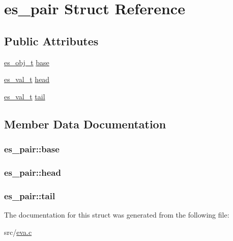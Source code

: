 \hypertarget{structes__pair}{\section{es\-\_\-pair Struct Reference}
\label{structes__pair}
}
\subsection*{Public Attributes}
\begin{DoxyCompactItemize}
\item 
\hyperlink{eva_8h_a3370a89a85f5ff467ca5e7dba47e63bc}{es\-\_\-obj\-\_\-t} \hyperlink{structes__pair_a6ca3203b44a47d4612af5f45303f96a9}{base}
\item 
\hyperlink{eva_8h_a31286b308f3660f383b567314be88045}{es\-\_\-val\-\_\-t} \hyperlink{structes__pair_a0ea11883f9bd8a3e249c6b54d03f3e95}{head}
\item 
\hyperlink{eva_8h_a31286b308f3660f383b567314be88045}{es\-\_\-val\-\_\-t} \hyperlink{structes__pair_a516657d75c9a8899eca3de4e2fd140dd}{tail}
\end{DoxyCompactItemize}


\subsection{Member Data Documentation}
\hypertarget{structes__pair_a6ca3203b44a47d4612af5f45303f96a9}{
\subsubsection[{base}]{ es\-\_\-pair\-::base}}\label{structes__pair_a6ca3203b44a47d4612af5f45303f96a9}
\hypertarget{structes__pair_a0ea11883f9bd8a3e249c6b54d03f3e95}{
\subsubsection[{head}]{ es\-\_\-pair\-::head}}\label{structes__pair_a0ea11883f9bd8a3e249c6b54d03f3e95}
\hypertarget{structes__pair_a516657d75c9a8899eca3de4e2fd140dd}{
\subsubsection[{tail}]{ es\-\_\-pair\-::tail}}\label{structes__pair_a516657d75c9a8899eca3de4e2fd140dd}


The documentation for this struct was generated from the following file\-:\begin{DoxyCompactItemize}
\item 
src/\hyperlink{eva_8c}{eva.\-c}\end{DoxyCompactItemize}
